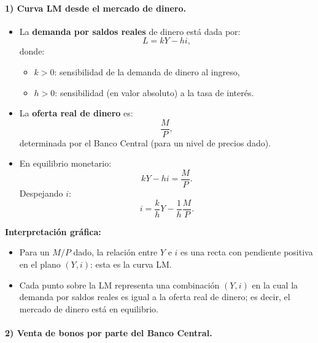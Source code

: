 \documentclass[11pt,addpoints]{article}
\begin{document}
\paragraph{1) Curva LM desde el mercado de dinero.}
\begin{itemize}
  \item La \textbf{demanda por saldos reales} de dinero está dada por:
  \[
    L = kY - hi,
  \]
  donde:
  \begin{itemize}
    \item $k>0$: sensibilidad de la demanda de dinero al ingreso,
    \newpage
    \vspace*{0.5cm}
    \item $h>0$: sensibilidad (en valor absoluto) a la tasa de interés.
  \end{itemize}
  \item La \textbf{oferta real de dinero} es:
  \[
    \frac{M}{P},
  \]
  determinada por el Banco Central (para un nivel de precios dado).
  \item En equilibrio monetario:
  \[
    kY - hi = \frac{M}{P}.
  \]
  Despejando $i$:
  \[
    i = \frac{k}{h}Y - \frac{1}{h}\frac{M}{P}.
  \]
\end{itemize}

\textbf{Interpretación gráfica:}
\begin{itemize}
  \item Para un $M/P$ dado, la relación entre $Y$ e $i$ es una recta con pendiente positiva en el plano $(Y,i)$: esta es la curva LM.
  \item Cada punto sobre la LM representa una combinación $(Y,i)$ en la cual la demanda por saldos reales es igual a la oferta real de dinero; es decir, el mercado de dinero está en equilibrio.
\end{itemize}

\paragraph{2) Venta de bonos por parte del Banco Central.}
\end{document}
